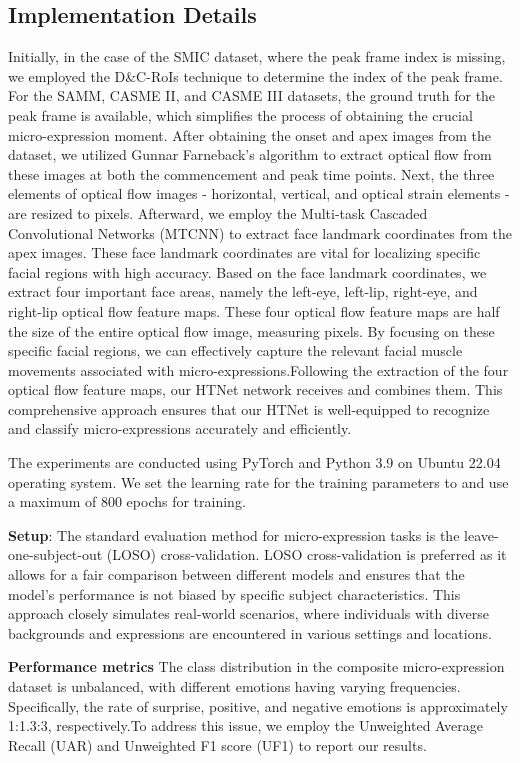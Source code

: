 \documentclass[review,12pt, 3p]{elsarticle}
\begin{document}
\subsection{Implementation Details}
Initially, in the case of the SMIC dataset, where the peak frame index is missing, we employed the D\&C-RoIs technique \cite{ref-39} to determine the index of the peak frame. For the SAMM, CASME II, and CASME III datasets, the ground truth for the peak frame is available, which simplifies the process of obtaining the crucial micro-expression moment. After obtaining the onset and apex images from the dataset, we utilized Gunnar Farneback's algorithm \cite{ref-41} to extract optical flow from these images at both the commencement and peak time points.  Next, the three elements of optical flow images - horizontal, vertical, and optical strain elements - are resized to  pixels. Afterward, we employ the Multi-task Cascaded Convolutional Networks (MTCNN) \cite{ref-42} to extract face landmark coordinates from the apex images. These face landmark coordinates are vital for localizing specific facial regions with high accuracy. Based on the face landmark coordinates, we extract four important face areas, namely the left-eye, left-lip, right-eye, and right-lip optical flow feature maps. These four optical flow feature maps are half the size of the entire optical flow image, measuring  pixels. By focusing on these specific facial regions, we can effectively capture the relevant facial muscle movements associated with micro-expressions.Following the extraction of the four optical flow feature maps, our HTNet network receives and combines them. This comprehensive approach ensures that our HTNet is well-equipped to recognize and classify micro-expressions accurately and efficiently.

The experiments are conducted using PyTorch and Python 3.9 on Ubuntu 22.04 operating system. We set the learning rate for the training parameters to  and use a maximum of 800 epochs for training. 

\textbf{Setup}: The standard evaluation method for micro-expression tasks is the leave-one-subject-out (LOSO) cross-validation. LOSO cross-validation is preferred as it allows for a fair comparison between different models and ensures that the model's performance is not biased by specific subject characteristics. This approach closely simulates real-world scenarios, where individuals with diverse backgrounds and expressions are encountered in various settings and locations. 


\textbf{Performance metrics}
The class distribution in the composite micro-expression dataset is unbalanced, with different emotions having varying frequencies. Specifically, the rate of surprise, positive, and negative emotions is approximately 1:1.3:3, respectively.To address this issue, we employ the Unweighted Average Recall (UAR) and Unweighted F1 score (UF1) to report our results. 
\end{document}
